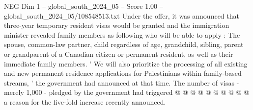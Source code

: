 \begin{textsample}{NEG Dim 1 – global\_south\_2024\_05 – Score 1.00 – global\_south\_2024\_05/108548513.txt}
Under the offer, it was announced that three-year temporary resident visas would be granted and the immigration minister revealed family members as following who will be able to apply : The spouse, common-law partner, child regardless of age, grandchild, sibling, parent or grandparent of a Canadian citizen or permanent resident, as well as their immediate family members. ' We will also prioritize the processing of all existing and new permanent residence applications for Palestinians within family-based streams, ' the government had announced at that time.
The number of visas - merely 1,000 - pledged by the government had triggered @ @ @ @ @ @ @ @ @ @ a reason for the five-fold increase recently announced.

\end{textsample}
